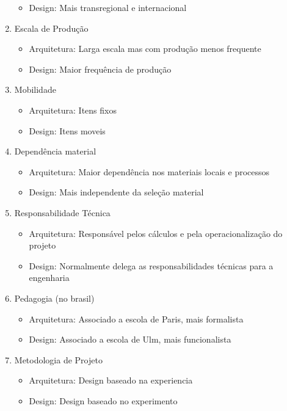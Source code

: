 \documentclass{article}
\begin{document}
\begin{enumerate}
\begin{itemize}
        \item Design: Mais transregional e internacional
    \end{itemize}
    \item Escala de Produção
    \begin{itemize}
        \item Arquitetura: Larga escala mas com produção menos frequente
        \item Design: Maior frequência de produção
    \end{itemize}
    \item Mobilidade
    \begin{itemize}
        \item Arquitetura: Itens fixos
        \item Design: Itens moveis
    \end{itemize}
    \item Dependência material
    \begin{itemize}
        \item Arquitetura: Maior dependência nos materiais locais e processos
        \item Design: Mais independente da seleção material
    \end{itemize}
    \item Responsabilidade Técnica
    \begin{itemize}
        \item Arquitetura: Responsável pelos cálculos e pela operacionalização do projeto
        \item Design: Normalmente delega as responsabilidades técnicas para a engenharia
    \end{itemize}
    \item Pedagogia (no brasil)
    \begin{itemize}
        \item Arquitetura: Associado a escola de Paris, mais formalista
        \item Design: Associado a escola de Ulm, mais funcionalista
    \end{itemize}
    \item Metodologia de Projeto
    \begin{itemize}
        \item Arquitetura: Design baseado na experiencia
        \item Design: Design baseado no experimento
    \end{itemize}
\end{enumerate}
\end{document}
